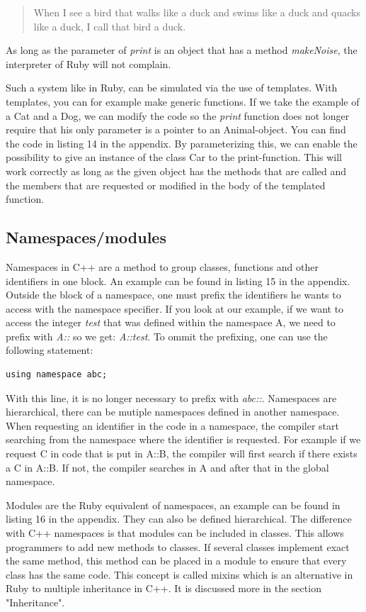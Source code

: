 \documentclass[10pt,a4paper,twocolumn]{article}
\begin{document}
\begin{quote}
When I see a bird that walks like a duck and swims like a duck and quacks like a duck, I call that bird a duck.
\end{quote}

As long as the parameter of \textit{print} is an object that has a method \textit{makeNoise}, the interpreter of Ruby will not complain.

Such a system like in Ruby, can be simulated via the use of templates. With templates, you can for example make generic functions. If we take the example of a Cat and a Dog, we can modify the code so the \textit{print} function does not longer require that his only parameter is a pointer to an Animal-object. You can find the code in listing 14 in the appendix. By parameterizing this, we can enable the possibility to give an instance of the class Car to the print-function. This will work correctly as long as the given object has the methods that are called and the members that are requested or modified in the body of the templated function.

\subsection{Namespaces/modules}
Namespaces in C++ are a method to group classes, functions and other identifiers in one block. An example can be found in listing 15 in the appendix. Outside the block of a namespace, one must prefix the identifiers he wants to access with the namespace specifier. If you look at our example, if we want to access the integer \textit{test} that was defined within the namespace A, we need to prefix with \textit{A::} so we get: \textit{A::test}. To ommit the prefixing, one can use the following statement:

\begin{lstlisting}
using namespace abc;
\end{lstlisting}

With this line, it is no longer necessary to prefix with \textit{abc::}. Namespaces are hierarchical, there can be mutiple namespaces defined in another namespace. When requesting an identifier in the code in a namespace, the compiler start searching from the namespace where the identifier is requested. For example if we request C in code that is put in A::B, the compiler will first search if there exists a C in A::B. If not, the compiler searches in A and after that in the global namespace.

Modules are the Ruby equivalent of namespaces, an example can be found in listing 16 in the appendix. They can also be defined hierarchical. The difference with C++ namespaces is that modules can be included in classes. This allows programmers to add new methods to classes. If several classes implement exact the same method, this method can be placed in a module to ensure that every class has the same code. This concept is called mixins which is an alternative in Ruby to multiple inheritance in C++. It is discussed more in the section "Inheritance".
\end{document}
